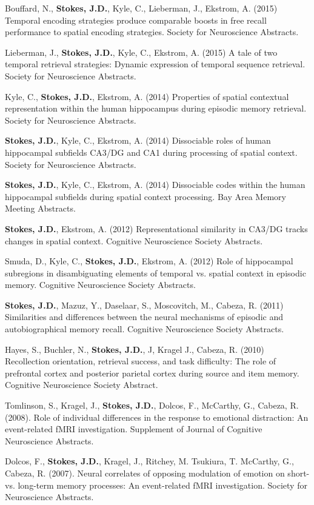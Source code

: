 \documentclass[line,margin,10pt]{res}
\begin{document}
\begin{resume}
Bouffard, N., \textbf{Stokes, J.D.}, Kyle, C., Lieberman, J., Ekstrom, A. (2015) Temporal encoding strategies produce comparable boosts in free recall performance to spatial encoding strategies. Society for Neuroscience Abstracts.

Lieberman, J., \textbf{Stokes, J.D.}, Kyle, C., Ekstrom, A. (2015) A tale of two temporal retrieval strategies: Dynamic expression of temporal sequence retrieval. Society for Neuroscience Abstracts.

Kyle, C., \textbf{Stokes, J.D.}, Ekstrom, A. (2014) Properties of spatial contextual representation within the human hippocampus during episodic memory retrieval. Society for Neuroscience Abstracts.

\textbf{Stokes, J.D.}, Kyle, C., Ekstrom, A. (2014) Dissociable roles of human hippocampal subfields CA3/DG and CA1 during processing of spatial context. Society for Neuroscience Abstracts.

\textbf{Stokes, J.D.}, Kyle, C., Ekstrom, A. (2014) Dissociable codes within the human hippocampal subfields during spatial context processing. Bay Area Memory Meeting Abstracts.

\textbf{Stokes, J.D.}, Ekstrom, A. (2012) Representational similarity in CA3/DG tracks changes in spatial context. Cognitive Neuroscience Society Abstracts.
 	
Smuda, D., Kyle, C., \textbf{Stokes, J.D.}, Ekstrom, A. (2012) Role of hippocampal subregions in disambiguating elements of temporal vs. spatial context in episodic memory. Cognitive Neuroscience Society Abstracts.
 	
\textbf{Stokes, J.D.}, Mazuz, Y., Daselaar, S., Moscovitch, M., Cabeza, R. (2011) Similarities and differences between the neural mechanisms of episodic and autobiographical memory recall. Cognitive Neuroscience Society Abstracts.
 	
Hayes, S., Buchler, N., \textbf{Stokes, J.D.}, J, Kragel J.,  Cabeza, R. (2010) Recollection orientation, retrieval success, and task difficulty: The role of prefrontal cortex and posterior parietal cortex during source and item memory. Cognitive Neuroscience Society Abstract.
 	
Tomlinson, S., Kragel, J., \textbf{Stokes, J.D.}, Dolcos, F., McCarthy, G., Cabeza, R. (2008). Role of individual differences in the response to emotional distraction: An event-related fMRI investigation. Supplement of Journal of Cognitive Neuroscience Abstracts.
 	
Dolcos, F., \textbf{Stokes, J.D.}, Kragel, J., Ritchey, M. Tsukiura, T. McCarthy, G., Cabeza, R. (2007). Neural correlates of opposing modulation of emotion on short- vs. long-term memory processes: An event-related fMRI investigation. Society for Neuroscience Abstracts.

\end{resume}
\end{document}
